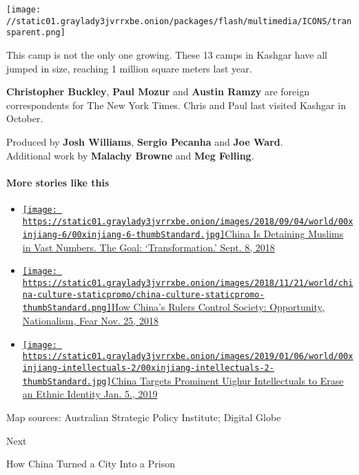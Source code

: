 \texttt{[image: //static01.graylady3jvrrxbe.onion/packages/flash/multimedia/ICONS/transparent.png]}

This camp is not the only one growing. These 13 camps in Kashgar have
all jumped in size, reaching 1 million square meters last year.

\textbf{Christopher Buckley}, \textbf{Paul Mozur} and \textbf{Austin
Ramzy} are foreign correspondents for The New York Times. Chris and Paul
last visited Kashgar in October.

Produced by \textbf{Josh Williams}, \textbf{Sergio Pecanha} and
\textbf{Joe Ward}.\\
Additional work by \textbf{Malachy Browne} and \textbf{Meg Felling}.

\hypertarget{more-stories-like-this}{%
\paragraph{More stories like this}\label{more-stories-like-this}}

\begin{itemize}
\tightlist
\item
  \href{https://www.nytimes3xbfgragh.onion/2018/09/08/world/asia/china-uighur-muslim-detention-camp.html}{\texttt{[image: https://static01.graylady3jvrrxbe.onion/images/2018/09/04/world/00xinjiang-6/00xinjiang-6-thumbStandard.jpg]}China
  Is Detaining Muslims in Vast Numbers. The Goal: `Transformation.'
  Sept. 8, 2018}
\item
  \href{https://www.nytimes3xbfgragh.onion/interactive/2018/11/25/world/asia/china-freedoms-control.html}{\texttt{[image: https://static01.graylady3jvrrxbe.onion/images/2018/11/21/world/china-culture-staticpromo/china-culture-staticpromo-thumbStandard.png]}How
  China's Rulers Control Society: Opportunity, Nationalism, Fear Nov.
  25, 2018}
\item
  \href{https://www.nytimes3xbfgragh.onion/2019/01/05/world/asia/china-xinjiang-uighur-intellectuals.html}{\texttt{[image: https://static01.graylady3jvrrxbe.onion/images/2019/01/06/world/00xinjiang-intellectuals-2/00xinjiang-intellectuals-2-thumbStandard.jpg]}China
  Targets Prominent Uighur Intellectuals to Erase an Ethnic Identity
  Jan. 5., 2019}
\end{itemize}

Map sources: Australian Strategic Policy Institute; Digital Globe

Next

How China Turned a City Into a Prison

